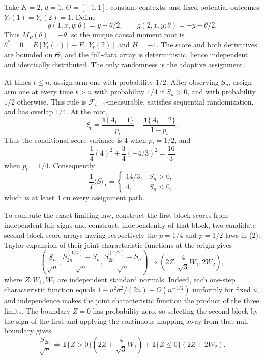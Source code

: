 Take \(K=2\), \(d=1\), \(\Theta=[-1,1]\), constant contexts, and fixed potential outcomes \(Y_t(1)=Y_t(2)=1\). Define
\[
 g(1,x,y;\theta)=y-\theta/2,
 \qquad g(2,x,y;\theta)=-y-\theta/2.
\tag{1}
\]
Thus \(M_P(\theta)=-\theta\), so the unique causal moment root is \(\theta^*=0=E[Y_t(1)]-E[Y_t(2)]\) and \(H=-1\). The score and both derivatives are bounded on \(\Theta\), and the full-data array is deterministic, hence independent and identically distributed. The only randomness is the adaptive assignment.

At times \(t\le n\), assign arm one with probability \(1/2\). After observing \(S_n\), assign arm one at every time \(t>n\) with probability \(1/4\) if \(S_n>0\), and with probability \(1/2\) otherwise. This rule is \(\mathcal F_{t-1}\)-measurable, satisfies sequential randomization, and has overlap \(1/4\). At the root,
\[
 \xi_t=\frac{\mathbf1\{A_t=1\}}{p_t}
 -\frac{\mathbf1\{A_t=2\}}{1-p_t}.
\tag{2}
\]
Thus the conditional score variance is \(4\) when \(p_t=1/2\), and
\[
 \frac14(4)^2+\frac34(-4/3)^2=\frac{16}{3}
\tag{3}
\]
when \(p_t=1/4\). Consequently
\[
 \frac1T\langle S\rangle_T
 =\begin{cases}14/3,&S_n>0,\\4,&S_n\le0,
 \end{cases}
\tag{4}
\]
which is at least \(4\) on every assignment path.

To compute the exact limiting law, construct the first-block scores from independent fair signs and construct, independently of that block, two candidate second-block score arrays having respectively the \(p=1/4\) and \(p=1/2\) laws in (2). Taylor expansion of their joint characteristic functions at the origin gives
\[
 \left(\frac{S_n}{\sqrt n},
 \frac{S^{(1/4)}_{2n}-S_n}{\sqrt n},
 \frac{S^{(1/2)}_{2n}-S_n}{\sqrt n}
 \right)\Rightarrow
 \left(2Z,\frac4{\sqrt3}W_1,2W_2\right),
\tag{5}
\]
where \(Z,W_1,W_2\) are independent standard normals. Indeed, each one-step characteristic function equals \(1-u^2\sigma^2/(2n)+O(n^{-3/2})\) uniformly for fixed \(u\), and independence makes the joint characteristic function the product of the three limits. The boundary \(Z=0\) has probability zero, so selecting the second block by the sign of the first and applying the continuous mapping away from that null boundary gives
\[
 \frac{S_{2n}}{\sqrt n}\Rightarrow
 \mathbf1\{Z>0\}\left(2Z+\frac4{\sqrt3}W_1\right)
 +\mathbf1\{Z\le0\}(2Z+2W_2).
\tag{6}
\]

